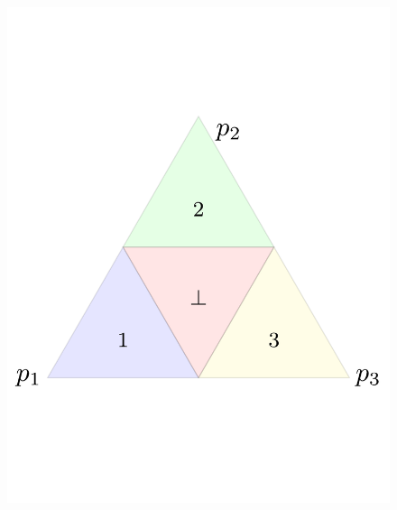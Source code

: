 \documentclass[anon,12pt]{colt2021} %
\begin{document}
\begin{figure}
\begin{minipage}{.32\textwidth}
	\includegraphics[width=\linewidth]{figs/abstain-alpha-half.pdf}
\end{minipage}%
\hfill
	\begin{minipage}{.32\textwidth}
	\centering

\end{minipage}
\end{figure}
\end{document}
